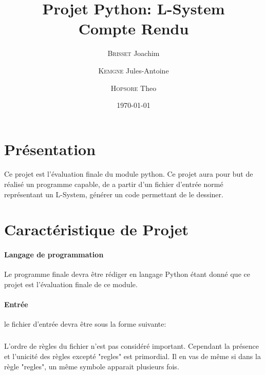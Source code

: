 \documentclass{report}
\title{Projet Python: L-System \\ Compte Rendu}
\author{\textsc{Brisset} Joachim \and \textsc{Kemgne} Jules-Antoine \and \textsc{Hopsore} Theo}
\date{\today}
\begin{document}
	\maketitle
	\clearpage
	
	\tableofcontents{\thispagestyle{fancy}}
	\clearpage
	
	\section{Présentation}
		\paragraph{}
			Ce projet est l'évaluation finale du module python. Ce projet aura pour but de réalisé un programme capable, de a partir d'un fichier d'entrée normé représentant un L-System, générer un code permettant de le dessiner.
	\section{Caractéristique de Projet}
		\paragraph{Langage de programmation}
			Le programme finale devra être rédiger en langage Python étant donné que ce projet est l'évaluation finale de ce module.
		\paragraph{Entrée}
			le fichier d'entrée devra être sous la forme suivante: \\

	
			\subparagraph{} L'ordre de règles du fichier n'est pas considéré important. Cependant la présence et l'unicité des règles excepté "regles" est primordial. Il en vas de même si dans la règle "regles", un même symbole apparait plusieurs fois.
		
\end{document}
